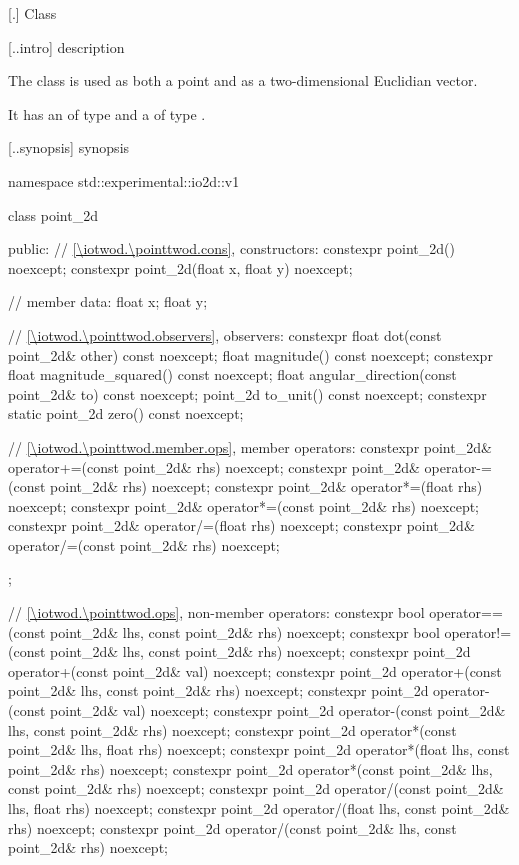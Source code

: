  [\iotwod.\pointtwod] {Class }

 [\iotwod.\pointtwod.intro] { description}

%
\pnum
The class  is used as both a point and as a two-dimensional Euclidian vector.

\pnum
It has an  of type  and a  of type .

 [\iotwod.\pointtwod.synopsis] { synopsis}

\begin{codeblock}
namespace std::experimental::io2d::v1 {
  class point_2d {
  public:
    // \ref{\iotwod.\pointtwod.cons}, constructors:
    constexpr point_2d() noexcept;
    constexpr point_2d(float x, float y) noexcept;

    // member data:
    float x;
    float y;
    
    // \ref{\iotwod.\pointtwod.observers}, observers:
    constexpr float dot(const point_2d& other) const noexcept;
    float magnitude() const noexcept;
    constexpr float magnitude_squared() const noexcept;
    float angular_direction(const point_2d& to) const noexcept;
    point_2d to_unit() const noexcept;
    constexpr static point_2d zero() const noexcept;
    
    // \ref{\iotwod.\pointtwod.member.ops}, member operators:
    constexpr point_2d& operator+=(const point_2d& rhs) noexcept;
    constexpr point_2d& operator-=(const point_2d& rhs) noexcept;
    constexpr point_2d& operator*=(float rhs) noexcept;
    constexpr point_2d& operator*=(const point_2d& rhs) noexcept;
    constexpr point_2d& operator/=(float rhs) noexcept;
    constexpr point_2d& operator/=(const point_2d& rhs) noexcept;
  };
  
  // \ref{\iotwod.\pointtwod.ops}, non-member operators:
  constexpr bool operator==(const point_2d& lhs, const point_2d& rhs)
    noexcept;
  constexpr bool operator!=(const point_2d& lhs, const point_2d& rhs)
    noexcept;
  constexpr point_2d operator+(const point_2d& val) noexcept;
  constexpr point_2d operator+(const point_2d& lhs, const point_2d& rhs)
    noexcept;
  constexpr point_2d operator-(const point_2d& val) noexcept;
  constexpr point_2d operator-(const point_2d& lhs, const point_2d& rhs)
    noexcept;
  constexpr point_2d operator*(const point_2d& lhs, float rhs) noexcept;
  constexpr point_2d operator*(float lhs, const point_2d& rhs) noexcept;
  constexpr point_2d operator*(const point_2d& lhs, const point_2d& rhs)
    noexcept;
  constexpr point_2d operator/(const point_2d& lhs, float rhs) noexcept;
  constexpr point_2d operator/(float lhs, const point_2d& rhs) noexcept;
  constexpr point_2d operator/(const point_2d& lhs, const point_2d& rhs)
    noexcept;
}
\end{codeblock}

